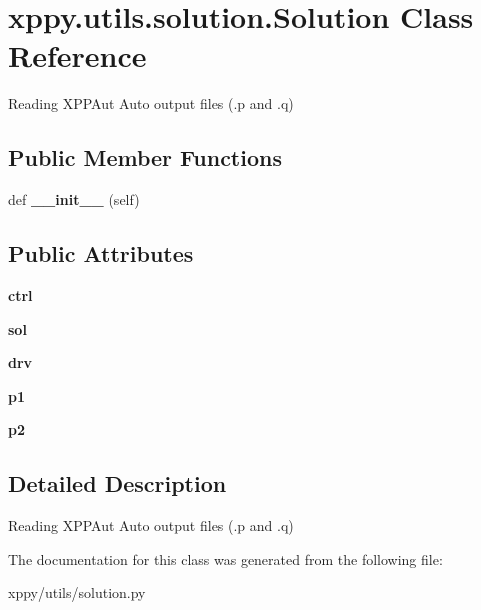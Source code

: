 \hypertarget{classxppy_1_1utils_1_1solution_1_1_solution}{}\section{xppy.\+utils.\+solution.\+Solution Class Reference}
\label{classxppy_1_1utils_1_1solution_1_1_solution}


Reading X\+P\+P\+Aut Auto output files (.p and .q)  


\subsection*{Public Member Functions}
\begin{DoxyCompactItemize}
\item 
\mbox{\label{classxppy_1_1utils_1_1solution_1_1_solution_ac6d1e71bee0568b58f4e915512446eec}} 
def {\bfseries \+\_\+\+\_\+init\+\_\+\+\_\+} (self)
\end{DoxyCompactItemize}
\subsection*{Public Attributes}
\begin{DoxyCompactItemize}
\item 
\mbox{\label{classxppy_1_1utils_1_1solution_1_1_solution_ad5e20d3565c60f9af1a6e17ea086ae91}} 
{\bfseries ctrl}
\item 
\mbox{\label{classxppy_1_1utils_1_1solution_1_1_solution_ac0acacc4329f67693124faf07c4e2b6f}} 
{\bfseries sol}
\item 
\mbox{\label{classxppy_1_1utils_1_1solution_1_1_solution_aefb1bc7e00e1db25a3d338c323eeb5c3}} 
{\bfseries drv}
\item 
\mbox{\label{classxppy_1_1utils_1_1solution_1_1_solution_a0e7ac08a99307cce8f2a843baaeae0bb}} 
{\bfseries p1}
\item 
\mbox{\label{classxppy_1_1utils_1_1solution_1_1_solution_ae38d7d64cede935609127aa6f9bfb344}} 
{\bfseries p2}
\end{DoxyCompactItemize}


\subsection{Detailed Description}
Reading X\+P\+P\+Aut Auto output files (.p and .q) 

The documentation for this class was generated from the following file\+:\begin{DoxyCompactItemize}
\item 
xppy/utils/solution.\+py\end{DoxyCompactItemize}
